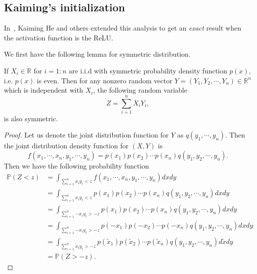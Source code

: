 
%
%


\subsection{Kaiming's initialization}
In~\cite{he2015delving}, Kaiming He and others extended this analysis to get an \textit{exact} result when the activation function is the  ReLU.

We first have the following lemma for symmetric distribution.
\begin{lemma}
	If $X_i \in \mathbb{R}$ for $i=1:n$ are i.i.d with symmetric probability density function $p(x)$, i.e. $p(x)$ is even.
	Then for any nonzero random vector $Y = (Y_1, Y_2, \cdots, Y_n) \in \mathbb{R}^n$ which is independent with $X_i$, 
	the following random variable
	\begin{equation}\label{key}
	Z = \sum_{i=1}^n X_i Y_i,
	\end{equation} 
	is also symmetric.
\end{lemma}

\begin{proof}
	Let us denote the joint distribution function for $Y$ as $q(y_1, \cdots, y_n)$. Then
	the joint distribution density function for $(X,Y)$ is 
	\begin{equation}\label{key}
	f(x_1, \cdots, x_n,y_1, \cdots, y_n) = p(x_1)p(x_2)\cdots p(x_n)q(y_1, y_2, \cdots, y_n).
	\end{equation}
	Then we have the following probability function
	\begin{equation}\label{key}
	\begin{aligned}
	\mathbb P(Z < z) &= \int_{\sum_{i=1}^n {x_i y_i} < z} f(x_1, \cdots, x_n,y_1, \cdots, y_n)  dxdy \\
	&= \int_{\sum_{i=1}^n {x_i y_i} < z} p(x_1)p(x_2)\cdots p(x_n)q(y_1, y_2, \cdots, y_n)  dxdy \\
	&= \int_{\sum_{i=1}^n {-x_i y_i} > -z} p(x_1)p(x_2)\cdots p(x_n)q(y_1, y_2, \cdots, y_n)  dxdy\\
	&= \int_{\sum_{i=1}^n {-x_i y_i} > -z} p(-x_1)p(-x_2)\cdots p(-x_n)q(y_1, y_2, \cdots, y_n)  dxdy\\
	&= \int_{\sum_{i=1}^n \tilde x_i y_i >-z} p(\tilde x_1)p(\tilde x_2)\cdots p(\tilde x_n)q(y_1, y_2, \cdots, y_n)  d\tilde xdy\\
	&= \mathbb P(Z >- z).
	\end{aligned}
	\end{equation}
\end{proof}

